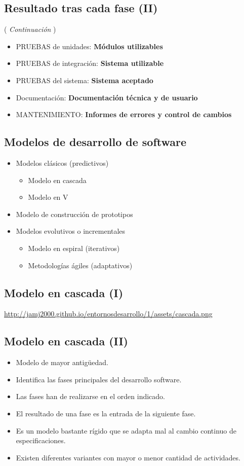 \documentclass[a4paper]{article}
\begin{document}
\subsection{Resultado tras cada fase (II)}
\label{resultado-tras-cada-fase-ii}
( \emph{Continuación} )

\begin{itemize}
\item PRUEBAS de unidades: \textbf{Módulos utilizables}
\item PRUEBAS de integración: \textbf{Sistema utilizable}
\item PRUEBAS del sistema: \textbf{Sistema aceptado}
\item Documentación: \textbf{Documentación técnica y de usuario}
\item MANTENIMIENTO: \textbf{Informes de errores y control de cambios}
\end{itemize}
\subsection{Modelos de desarrollo de software}
\label{modelos-de-desarrollo-de-software}
\begin{itemize}
\item Modelos clásicos (predictivos)
\begin{itemize}
\item Modelo en cascada
\item Modelo en V
\end{itemize}
\item Modelo de construcción de prototipos
\item Modelos evolutivos o incrementales
\begin{itemize}
\item Modelo en espiral (iterativos)
\item Metodologías ágiles (adaptativos)
\end{itemize}
\end{itemize}
\subsection{Modelo en cascada (I)}
\label{modelo-en-cascada-i}
\url{http://jamj2000.github.io/entornosdesarrollo/1/assets/cascada.png}
\subsection{Modelo en cascada (II)}
\label{modelo-en-cascada-ii}
\begin{itemize}
\item Modelo de mayor antigüedad.
\item Identifica las fases principales del desarrollo software.
\item Las fases han de realizarse en el orden indicado.
\item El resultado de una fase es la entrada de la siguiente fase.
\item Es un modelo bastante rígido que se adapta mal al cambio continuo de
especificaciones.
\item Existen diferentes variantes con mayor o menor cantidad de
actividades.
\end{itemize}
\end{document}
